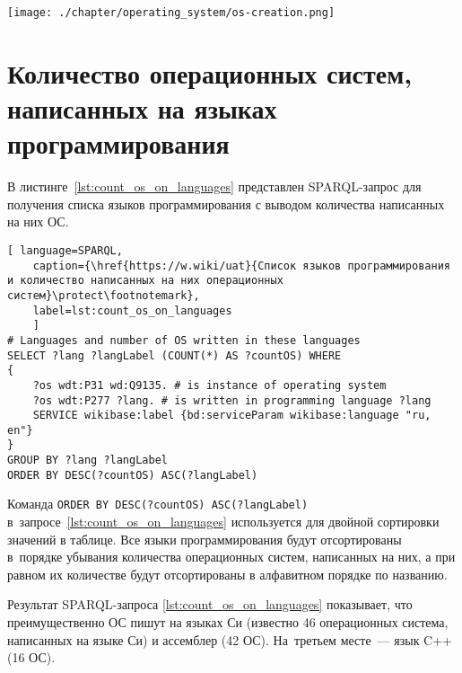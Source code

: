 \begin{figure*}[h!]
	\texttt{[image: ./chapter/operating\_system/os-creation.png]}
    \caption[Часть временной шкалы с датами выпуска ОС.]{Часть временной шкалы с датами выпуска операционных систем с~1955 по~2020 год. Шкала построена по запросу~\protect\ref{lst:inception_time_of_operating_systems}.}
	\label{fig:os_creation}
\end{figure*}





\section{Количество операционных систем, написанных на языках программирования}

В листинге~\ref{lst:count_os_on_languages} представлен SPARQL-запрос для получения списка языков программирования с выводом количества написанных на них ОС.

\begin{lstlisting}[ language=SPARQL, 
	caption={\href{https://w.wiki/uat}{Список языков программирования и количество написанных на них операционных систем}\protect\footnotemark},
	label=lst:count_os_on_languages
	]
# Languages and number of OS written in these languages
SELECT ?lang ?langLabel (COUNT(*) AS ?countOS) WHERE 
{
	?os wdt:P31 wd:Q9135. # is instance of operating system
	?os wdt:P277 ?lang. # is written in programming language ?lang
    SERVICE wikibase:label {bd:serviceParam wikibase:language "ru, en"}
}
GROUP BY ?lang ?langLabel
ORDER BY DESC(?countOS) ASC(?langLabel)
\end{lstlisting}


Команда \lstinline|ORDER BY DESC(?countOS) ASC(?langLabel)| в~запросе~\ref{lst:count_os_on_languages} 
используется для двойной сортировки значений в таблице. 
Все языки программирования будут отсортированы в~порядке убывания количества операционных систем, 
написанных на них, а при равном их количестве будут отсортированы в алфавитном порядке по названию.

Результат SPARQL-запроса \ref{lst:count_os_on_languages} показывает, 
что преимущественно ОС пишут на языках Си (известно 46 операционных система, написанных на языке Си) и ассемблер (42 ОС). 
На~третьем месте~--- язык C++ (16 ОС).



